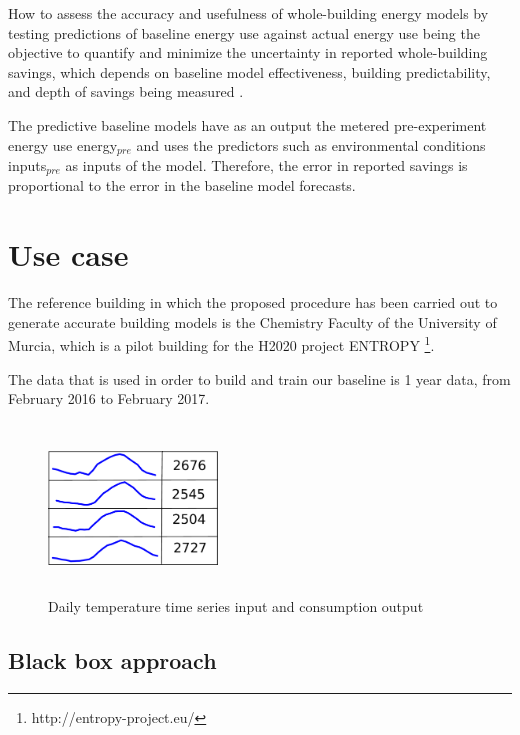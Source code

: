 \documentclass[10pt, conference, compsocconf]{IEEEtran}
\begin{document}
How to assess the accuracy and usefulness of whole-building energy models by testing predictions of baseline energy use against actual energy use being the objective to quantify and minimize the uncertainty in reported whole-building savings, which depends
on baseline model effectiveness, building predictability, and depth of savings being measured \cite{kramer2013energy}.

The predictive baseline models have as an output the metered pre-experiment energy use energy$_{pre}$ and uses the predictors such as environmental conditions inputs$_{pre}$ as inputs of the model. Therefore, the error in reported savings is proportional to the error in the baseline model forecasts.


\section{Use case}

The reference building in which the proposed procedure has been carried out to generate accurate building models is the Chemistry Faculty of the University of Murcia, which is a pilot building for the H2020 project ENTROPY \footnote{http://entropy-project.eu/}.  

The data that is used in order to build and train our baseline is 1 year data, from February 2016 to February 2017. 

\begin{figure}[h]%
\centering
\centerline{\includegraphics[width=4.5cm,height=4.5cm,keepaspectratio]{./pics/table_inputs_outputs.pdf}}
\caption{Daily temperature time series input and consumption output}\vspace*{-6pt}
  \label{fig:inout}
\end{figure}

\subsection{Black box approach}
\end{document}
